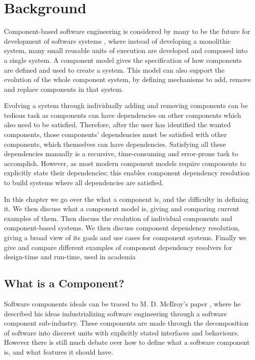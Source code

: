 \chapter{Background}
\label{background}
{}Component-based software engineering is considered by many to be the future for development of software systems \cite{Szyperski2002},
{}where instead of developing a monolithic system, 
{}many small reusable units of execution are developed and composed into a single system.
{}A component model gives the specification of how components are defined and used to create a system.
{}This model can also support the evolution of the whole component system, by defining mechanisms to add, remove and replace components in that system.

Evolving a system through individually adding and removing components can be tedious task 
as components can have dependencies on other components which also need to be satisfied.
Therefore, after the user has identified the wanted components, 
those components' dependencies must be satisfied with other components, which themselves can have dependencies.
Satisfying all these dependencies manually is a recursive, time-consuming and error-prone task to accomplish.
However, as most modern component models require components to explicitly state their dependencies; 
this enables component dependency resolution to build systems where all dependencies are satisfied.

In this chapter we go over the what a component is, and the difficulty in defining it.
We then discuss what a component model is, giving and comparing current examples of them.
Then discuss the evolution of individual components and component-based systems.
We then discuss component dependency resolution, giving a broad view of its goals and use cases for component systems.
Finally we give and compare different examples of component dependency resolvers for design-time and run-time, used in academia 
 
 
\section{What is a Component?}
Software components ideals can be traced to M. D. McIlroy's paper \cite{mcilroy_mass_1969}, where he described his ideas industrializing software engineering through a software component sub-industry. 
These components are made through the decomposition of software into discreet units with explicitly stated interfaces and behaviours.
However there is still much debate over how to define what a software component is, and what features it should have.\\

